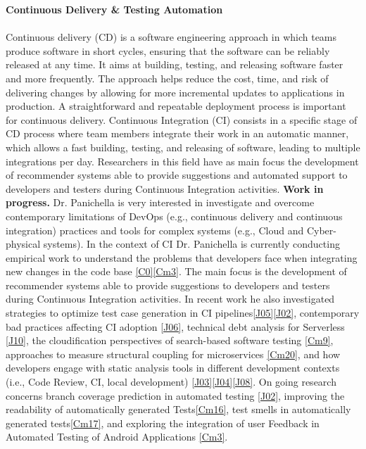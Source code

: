 \documentclass[10pt]{article}
\newcommand{\blankline}{\quad\pagebreak[3]}
\begin{document}
\textbf{Continuous Delivery \& Testing Automation}
\blankline\\\\
Continuous delivery (CD) is a software engineering approach in which teams produce software in short cycles, ensuring that the software can be reliably released at any time. It aims at building, testing, and releasing software faster and more frequently. The approach helps reduce the cost, time, and risk of delivering changes by allowing for more incremental updates to applications in production. A straightforward and repeatable deployment process is important for continuous delivery. Continuous Integration (CI) consists in a specific stage of CD process where team members integrate their work in an automatic manner, which allows a fast building, testing, and releasing of software, leading to multiple integrations per day. Researchers in this field have as main focus the development of recommender systems able to provide suggestions and automated support to developers and testers during Continuous Integration activities. 
   \textbf{Work in progress.}  
   Dr. Panichella is very interested in investigate and overcome contemporary limitations of DevOps (e.g., continuous delivery and continuous integration) practices and tools for complex systems (e.g., Cloud and Cyber-physical systems). 
   In the context of CI Dr. Panichella is currently conducting empirical work to understand the problems that developers face when integrating new changes in the code base \ref{C0}\ref{Cm3}. The main focus is the development of recommender systems able to provide suggestions to developers and testers during Continuous Integration activities. In recent work he also investigated strategies to optimize test case generation in CI pipelines\ref{J05}\ref{J02},  contemporary bad practices affecting CI adoption \ref{J06}, technical debt analysis for Serverless \ref{J10},   the cloudification perspectives of search-based software testing \ref{Cm9}\label{Cm15}, approaches to measure structural coupling for microservices \ref{Cm20}, and how developers engage with static analysis tools in different development contexts (i.e., Code Review, CI, local development) \ref{J03}\ref{J04}\ref{J08}.
   On going research concerns branch coverage prediction in automated testing \ref{J02},  improving the readability of automatically generated Tests\ref{Cm16}, test smells in automatically generated tests\ref{Cm17}, and exploring the integration of user Feedback in Automated Testing of Android Applications \ref{Cm3}.
    \\
\end{document}
